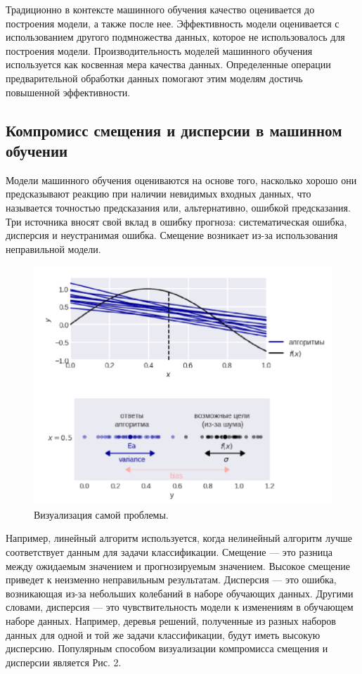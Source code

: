 \documentclass{article}
\begin{document}
Традиционно в контексте машинного обучения качество оценивается до построения модели, а также после нее. Эффективность модели оценивается с использованием другого подмножества данных, которое не использовалось для построения модели. Производительность моделей машинного обучения используется как косвенная мера качества данных. Определенные операции предварительной обработки данных помогают этим моделям достичь повышенной эффективности.

\subsection{Компромисс смещения и дисперсии в машинном обучении}

Модели машинного обучения оцениваются на основе того, насколько хорошо они предсказывают реакцию при наличии невидимых входных данных, что называется точностью предсказания или, альтернативно, ошибкой предсказания. Три источника вносят свой вклад в ошибку прогноза: систематическая ошибка, дисперсия и неустранимая ошибка. Смещение возникает из-за использования неправильной модели. 

\begin{figure}[H]
    \centering
    \includegraphics[scale=0.3]{problem_visualization.png}
    \caption{Визуализация самой проблемы.}
    \label{fig:my_label}
\end{figure}

Например, линейный алгоритм используется, когда нелинейный алгоритм лучше соответствует данным для задачи классификации. Смещение — это разница между ожидаемым значением и прогнозируемым значением. Высокое смещение приведет к неизменно неправильным результатам. Дисперсия — это ошибка, возникающая из-за небольших колебаний в наборе обучающих данных. Другими словами, дисперсия — это чувствительность модели к изменениям в обучающем наборе данных. Например, деревья решений, полученные из разных наборов данных для одной и той же задачи классификации, будут иметь высокую дисперсию. Популярным способом визуализации компромисса смещения и дисперсии является Рис. 2. 
\end{document}
